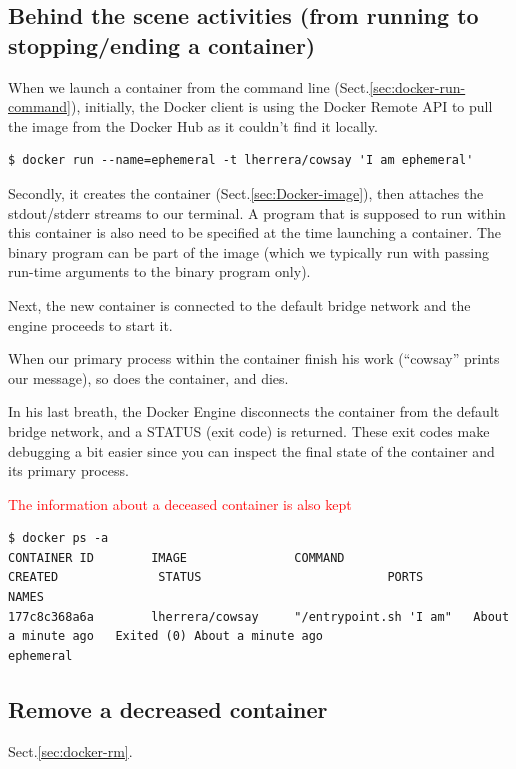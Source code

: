 \subsection{Behind the scene activities (from running to stopping/ending a container)}

When we launch a container from the command line
(Sect.\ref{sec:docker-run-command}), initially, the Docker client is using the
Docker Remote API to pull the image from the Docker Hub as it couldn’t find it
locally.
\begin{verbatim}
$ docker run --name=ephemeral -t lherrera/cowsay 'I am ephemeral'

\end{verbatim}


Secondly, it creates the container (Sect.\ref{sec:Docker-image}), then attaches
the stdout/stderr streams to our terminal. A program that is supposed to run
within this container is also need to be specified at the time launching a
container. The binary program can be part of the image (which we typically run
with passing run-time arguments to the binary program only).

Next, the new container is connected to the default bridge network and the
engine proceeds to start it.

When our primary process within the container finish his work (“cowsay” prints
our message), so does the container, and dies.

In his last breath, the Docker Engine disconnects the container from the default
bridge network, and a STATUS (exit code) is returned. These exit codes make
debugging a bit easier since you can inspect the final state of the container
and its primary process.


\textcolor{red}{The information about a deceased container is also kept}
\begin{verbatim}
$ docker ps -a
CONTAINER ID        IMAGE               COMMAND                  CREATED              STATUS                          PORTS               NAMES
177c8c368a6a        lherrera/cowsay     "/entrypoint.sh 'I am"   About a minute ago   Exited (0) About a minute ago                       ephemeral
\end{verbatim}

\subsection{Remove a decreased container}

Sect.\ref{sec:docker-rm}.

